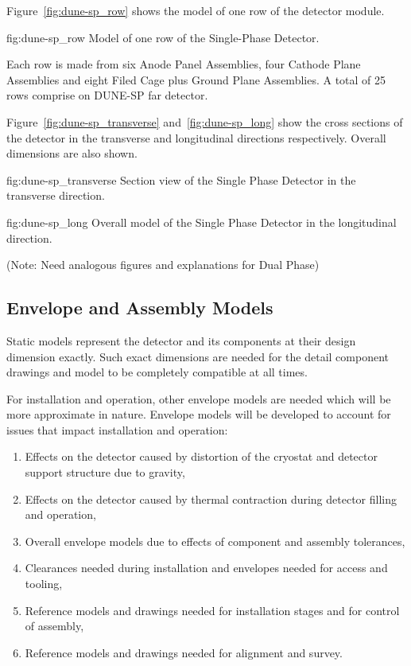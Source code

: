 Figure~\ref{fig:dune-sp_row} shows the model of one row of the
detector module.
\begin{dunefigure}{fig:dune-sp_row}
  {Model of one row of the Single-Phase Detector.}
\end{dunefigure}
Each row is made from six Anode Panel Assemblies,
four Cathode Plane Assemblies and eight Filed Cage plus Ground Plane
Assemblies. A total of 25 rows comprise on DUNE-SP far detector.

Figure~\ref{fig:dune-sp_transverse} and~\ref{fig:dune-sp_long} show
the cross sections of the detector in the transverse and longitudinal
directions respectively. Overall dimensions are also shown.
\begin{dunefigure}{fig:dune-sp_transverse}
  {Section view of the Single Phase Detector in the transverse direction.}
\end{dunefigure}
\begin{dunefigure}{fig:dune-sp_long}
  {Overall model of the Single Phase Detector in the longitudinal direction.}
\end{dunefigure}

(Note: Need analogous figures and explanations for Dual Phase)

\subsection{Envelope and Assembly Models}
\label{sec:fdsp-coord-integ-envelope}
Static models represent the detector and its components at their
design dimension exactly. Such exact dimensions are needed for the
detail component drawings and model to be completely compatible at all
times.

For installation and operation, other envelope models are needed which
will be more approximate in nature. Envelope models will be developed
to account for issues that impact installation and operation:
\begin{enumerate}
 \item Effects on the detector caused by distortion of the cryostat
   and detector support structure due to gravity,
 \item Effects on the detector caused by thermal contraction during
   detector filling and operation,
 \item Overall envelope models due to effects of component and
   assembly tolerances,
 \item Clearances needed during installation and envelopes needed for
   access and tooling,
 \item Reference models and drawings needed for installation stages
   and for control of assembly,
 \item Reference models and drawings needed for alignment and survey.
\end{enumerate}


